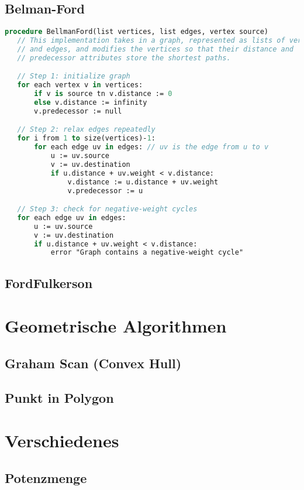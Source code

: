 \documentclass[10pt,a4paper,ngerman,oneside,
]{article}
\begin{document}
\subsection{Belman-Ford}
\begin{lstlisting}[language=pascal]
procedure BellmanFord(list vertices, list edges, vertex source)
   // This implementation takes in a graph, represented as lists of vertices
   // and edges, and modifies the vertices so that their distance and
   // predecessor attributes store the shortest paths.

   // Step 1: initialize graph
   for each vertex v in vertices:
       if v is source tn v.distance := 0
       else v.distance := infinity
       v.predecessor := null

   // Step 2: relax edges repeatedly
   for i from 1 to size(vertices)-1:
       for each edge uv in edges: // uv is the edge from u to v
           u := uv.source
           v := uv.destination
           if u.distance + uv.weight < v.distance:
               v.distance := u.distance + uv.weight
               v.predecessor := u

   // Step 3: check for negative-weight cycles
   for each edge uv in edges:
       u := uv.source
       v := uv.destination
       if u.distance + uv.weight < v.distance:
           error "Graph contains a negative-weight cycle"
\end{lstlisting}
\subsection{FordFulkerson}

\section{Geometrische Algorithmen}
\subsection{Graham Scan (Convex Hull)}

\subsection{Punkt in Polygon}

\section{Verschiedenes}
\subsection{Potenzmenge}

\end{document}
